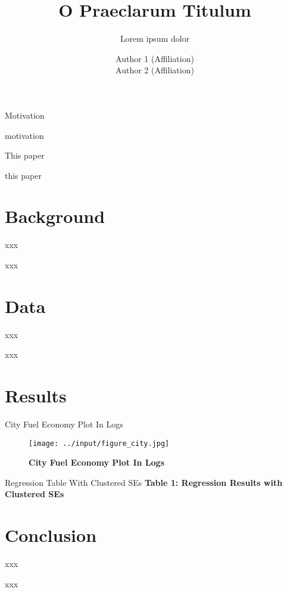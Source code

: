 \documentclass[10pt,t,aspectratio=169]{beamer}
\title{O Praeclarum Titulum}
\subtitle{Lorem ipsum dolor}
\date{}
\author{Author 1 (Affiliation) \\
        Author 2 (Affiliation)}
\begin{document}
\maketitle

\begin{frame}{Motivation}

    motivation

\end{frame}

\begin{frame}{This paper}

    this paper
  
\end{frame}

\section{Background}

\begin{frame}{xxx}

    xxx
  
\end{frame}

\section{Data}

\begin{frame}{xxx}

    xxx
  
\end{frame}

\section{Results}

\begin{frame}{City Fuel Economy Plot In Logs}

	\begin{figure}[!htp]
    	\centering
   	 	\caption{\bf{City Fuel Economy Plot In Logs}}
   		\texttt{[image: ../input/figure\_city.jpg]}
	\end{figure}
  
\end{frame}

\begin{frame}{Regression Table With Clustered SEs}
  \centering
  \textbf{Table 1: Regression Results with Clustered SEs}
  \vspace{0.3cm}
  \resizebox{\textwidth}{!}{}
\end{frame}


\section{Conclusion}

\begin{frame}{xxx}

    xxx
  
\end{frame}
\end{document}
